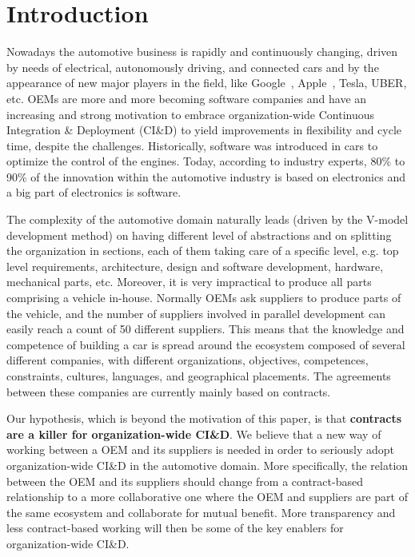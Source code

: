 \section{Introduction}\label{sec:intro}


Nowadays the automotive business is rapidly and continuously changing, driven by needs of 
electrical, autonomously driving, and connected cars and by the appearance of new major players in
the field, like Google~\cite{Google}, Apple~\cite{Apple,Apple2}, Tesla, UBER, etc.
OEMs are more and more becoming software companies 
and have an increasing and strong motivation
to embrace organization-wide Continuous Integration \& Deployment (CI\&D) to yield improvements
in flexibility and cycle time, despite the challenges.
Historically, software was introduced in cars
to optimize the control of the engines. 
Today, according to industry experts, 80\%
to 90\% of the innovation within the automotive industry is
based on electronics and a big part of electronics is software. 

The complexity of the automotive domain naturally leads (driven by the V-model development method) on having different level of abstractions and on splitting the organization in sections, each of them taking care of a specific level, e.g. top level requirements,
architecture, design and software development, hardware, mechanical parts, etc. 
Moreover, it is very impractical to produce all parts comprising a vehicle in-house. Normally OEMs 
ask suppliers to produce parts of the vehicle, and the number of suppliers involved in parallel development can easily
reach a count of 50 different suppliers. 
This means that the knowledge and competence of building a car is spread around the ecosystem composed of several different companies, with different organizations, objectives, competences, constraints, cultures, languages, and geographical placements. 
The agreements between these companies are currently mainly based on contracts. 

Our hypothesis, which is beyond the motivation of this paper, is that {\bf contracts are a killer for organization-wide CI\&D}.
We believe that a new way of working between a OEM and its
suppliers is needed in order to seriously adopt organization-wide CI\&D in the automotive domain. More specifically, the relation between the OEM and its suppliers should change from a contract-based relationship to a more
collaborative one where the OEM and suppliers are part
of the same ecosystem and collaborate for mutual benefit.
More transparency and less contract-based working will then
be some of the key enablers for organization-wide CI\&D.

